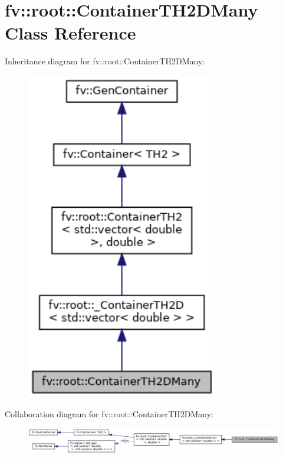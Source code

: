 \hypertarget{classfv_1_1root_1_1ContainerTH2DMany}{}\section{fv\+:\+:root\+:\+:Container\+T\+H2\+D\+Many Class Reference}
\label{classfv_1_1root_1_1ContainerTH2DMany}


Inheritance diagram for fv\+:\+:root\+:\+:Container\+T\+H2\+D\+Many\+:
\nopagebreak
\begin{figure}[H]
\begin{center}
\leavevmode
\includegraphics[width=238pt]{classfv_1_1root_1_1ContainerTH2DMany__inherit__graph}
\end{center}
\end{figure}


Collaboration diagram for fv\+:\+:root\+:\+:Container\+T\+H2\+D\+Many\+:
\nopagebreak
\begin{figure}[H]
\begin{center}
\leavevmode
\includegraphics[width=350pt]{classfv_1_1root_1_1ContainerTH2DMany__coll__graph}
\end{center}
\end{figure}
